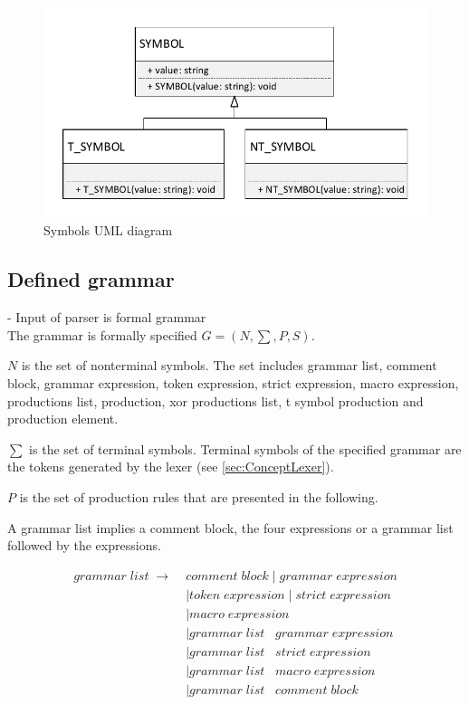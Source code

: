 \begin{figure}[H]
\centering
\includegraphics[width=.7\textwidth]{images/Implementation_parser_symbol_uml.pdf}
\caption{Symbols UML diagram}
\label{fig:ImplementationUMLSymbols}
\end{figure}


\subsection{Defined grammar}\label{sec:ImplementationGrammar}

- Input of parser is formal grammar \\

The grammar is formally specified $G = (N,\sum,P,S)$.

$N$ is the set of nonterminal symbols. The set includes grammar list, comment block, grammar expression, token expression, strict expression, macro expression, productions list, production, xor productions list, t symbol production and production element.

$\sum$ is the set of terminal symbols. Terminal symbols of the specified grammar are the tokens generated by the lexer (see \ref{sec:ConceptLexer}).

$P$ is the set of production rules that are presented in the following. 

A grammar list implies a comment block, the four expressions or a grammar list followed by the expressions.

\begin{align*}
	grammar\;list\; \rightarrow\; &comment\;block
	     		\mid grammar\;expression  \\
			   &\mid token\;expression
                \mid strict\;expression\\
               &\mid macro\;expression \\
               &\mid grammar\;list\;\;\;grammar\;expression\\
               &\mid grammar\;list\;\;\;strict\;expression \\
               &\mid grammar\;list\;\;\;macro\;expression \\
               &\mid grammar\;list\;\;\;comment\;block               
\end{align*}


